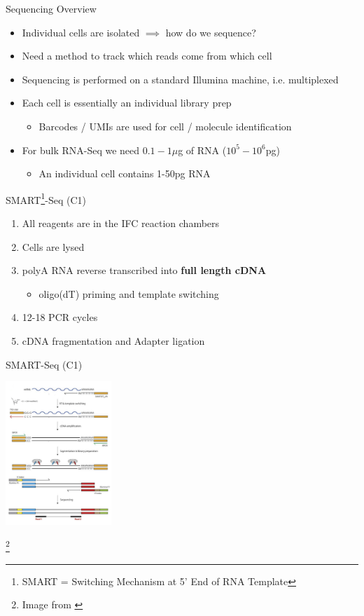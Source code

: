 \documentclass[aspectratio=169,11pt]{beamer}
\newcommand\blfootnote[1]{%
  \begingroup
  \renewcommand\thefootnote{}\footnote{#1}%
  \addtocounter{footnote}{-1}%
  \endgroup
}
\begin{document}
\begin{frame}{Sequencing Overview}

	\begin{itemize}
		\item Individual cells are isolated $\implies$ how do we sequence?
		\item Need a method to track which reads come from which cell
		\item Sequencing is performed on a standard Illumina machine, i.e. multiplexed
		\item Each cell is essentially an individual library prep
		\begin{itemize}
			\item Barcodes / UMIs are used for cell / molecule identification
		\end{itemize}
		\item For bulk RNA-Seq we need $0.1-1\mu$g of RNA ($10^5-10^6$pg)
		\begin{itemize}
			\item An individual cell contains 1-50pg RNA
		\end{itemize}
	\end{itemize}

\end{frame}

\begin{frame}{SMART\footnote{SMART = Switching Mechanism at 5' End of RNA Template}-Seq (C1)}

	\begin{enumerate}
		\item All reagents are in the IFC reaction chambers
		\item Cells are lysed
		\item polyA RNA reverse transcribed into \textbf{full length cDNA}
		\begin{itemize}
			\item oligo(dT) priming and template switching
		\end{itemize}
		\item 12-18 PCR cycles
		\item cDNA fragmentation and Adapter ligation
	\end{enumerate}


\end{frame}

\begin{frame}{SMART-Seq (C1)}
	\begin{center}
	\includegraphics[width=0.3\textwidth]{figures/SMARTSeq.png} 
	\end{center}
	\blfootnote{Image from \cite{pmid27442339}}
\end{frame}
\end{document}
